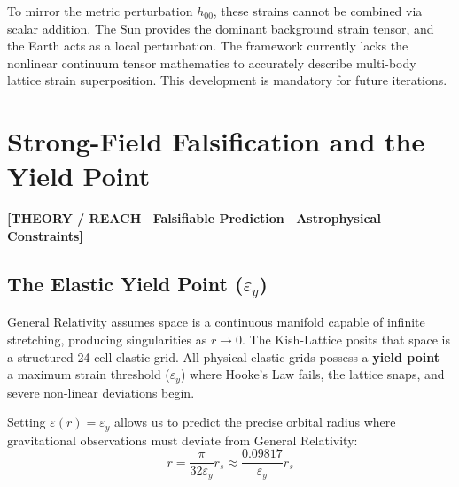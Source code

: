 \documentclass[11pt, letterpaper, openany]{book}
\begin{document}
To mirror the metric perturbation $h_{00}$, these strains cannot be combined via scalar addition. The Sun provides the dominant background strain tensor, and the Earth acts as a local perturbation. The framework currently lacks the nonlinear continuum tensor mathematics to accurately describe multi-body lattice strain superposition. This development is mandatory for future iterations.

\chapter{Strong-Field Falsification and the Yield Point}

\begin{center}
{\color{theorytag}\textbf{[THEORY / REACH \textbullet\ Falsifiable Prediction \textbullet\ Astrophysical Constraints]}}
\end{center}

\section{The Elastic Yield Point ($\varepsilon_y$)}
\label{sec:yield}

General Relativity assumes space is a continuous manifold capable of infinite stretching, producing singularities as $r \to 0$. The Kish-Lattice posits that space is a structured 24-cell elastic grid. All physical elastic grids possess a \textbf{yield point}—a maximum strain threshold ($\varepsilon_y$) where Hooke's Law fails, the lattice snaps, and severe non-linear deviations begin.

Setting $\varepsilon(r) = \varepsilon_y$ allows us to predict the precise orbital radius where gravitational observations must deviate from General Relativity:
\[
r = \frac{\pi}{32 \varepsilon_y} r_s \approx \frac{0.09817}{\varepsilon_y} r_s
\]
\end{document}

